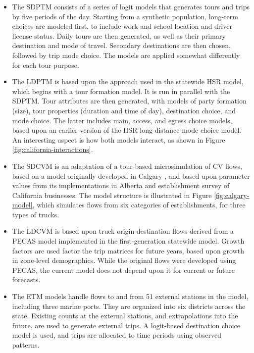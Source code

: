 \begin{itemize}
\item
The SDPTM consists of a series of logit models that generates tours and trips by five periods of the day. Starting from a synthetic population, long-term choices are modeled first, to include work and school location and driver license status. Daily tours are then generated, as well as their primary destination and mode of travel. Secondary destinations are then chosen, followed by trip mode choice. The models are applied somewhat differently for each tour purpose.
\item
The LDPTM is based upon the approach used in the statewide HSR model, which begins with a tour formation model. It is run in parallel with the SDPTM. Tour attributes are then generated, with models of party formation (size), tour properties (duration and time of day), destination choice, and mode choice. The latter includes main, access, and egress choice models, based upon an earlier version of the HSR long-distance mode choice model. An interesting aspect is how both models interact, as shown in Figure \ref{fig:california-interactions}.
\item
  The SDCVM is an adaptation of a tour-based microsimulation of CV flows, based on a model originally developed in Calgary \citep{hunt07}, and based upon parameter values from its implementations in Alberta and establishment survey of California businesses. The model structure is illustrated in Figure \ref{fig:calgary-model}, which simulates flows from six categories of establishments, for three types of trucks.
\item
The LDCVM is based upon truck origin-destination flows derived from a PECAS model implemented in the first-generation statewide model. Growth factors are used factor the trip matrices for future years, based upon growth in zone-level demographics. While the original flows were developed using PECAS, the current model does not depend upon it for current or future forecasts.
\item
The ETM models handle flows to and from 51 external stations in the model, including three marine ports. They are organized into six districts across the state. Existing counts at the external stations, and extrapolations into the future, are used to generate external trips. A logit-based destination choice model is used, and trips are allocated to time periods using observed patterns.
\end{itemize}

